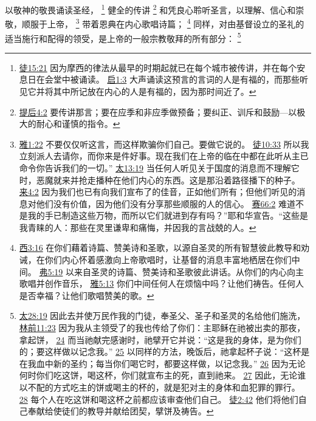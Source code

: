 \documentclass[12pt, a4paper, oneside]{ctexart}
\newcounter{parnum}[section]
\newcommand{\N}{%
   \noindent\refstepcounter{parnum}%
    \makebox[\parindent][l]{\textbf{\arabic{parnum}.}}}
\begin{document}
\N 以敬神的敬畏诵读圣经，
	\footnote {
		\href{https://biblehub.com/acts/15-21.htm}{徒15:21} 因为摩西的律法从最早的时期起就已在每个城市被传讲，并在每个安息日在会堂中被诵读。
		\href{https://biblehub.com/revelation/1-3.htm}{启1:3} 大声诵读这预言的言词的人是有福的，而那些听见它并将其中所记放在内心的人是有福的，因为那时间近了。
	}
	健全的传讲
	\footnote {
		\href{https://biblehub.com/2_timothy/4-2.htm}{提后4:2} 要传讲那言；要在应季和非应季做预备；要纠正、训斥和鼓励---以极大的耐心和谨慎的指令。
	}
	和凭良心聆听圣言，以理解、信心和崇敬，顺服于上帝，
	\footnote {
		\href{https://biblehub.com/james/1-22.htm}{雅1:22} 不要仅仅听这言，而这样欺骗你们自己。要做它说的。
		\href{https://biblehub.com/acts/10-33.htm}{徒10:33} 所以我立刻派人去请你，而你来是件好事。现在我们在上帝的临在中都在此听从主已命令你告诉我们的一切。”
		\href{https://biblehub.com/matthew/13-19.htm}{太13:19} 当任何人听见关于国度的消息而不理解它时，恶魔就来并抢走播种在他们内心的东西。这是那沿着路径播下的种子。
		\href{https://biblehub.com/hebrews/4-2.htm}{来4:2} 因为我们也已有向我们宣布了的佳音，正如他们所有；但他们听见的消息对他们没有价值，因为他们没有分享那些顺服的人的信心。
		\href{https://biblehub.com/isaiah/66-2.htm}{赛66:2} 难道不是我的手已制造这些万物，而所以它们就进到存有吗？”耶和华宣告。“这些是我青睐的人：那些在灵里谦卑和痛悔，并因我的言战兢的人。
	}
	带着恩典在内心歌唱诗篇；
	\footnote {
		\href{https://biblehub.com/colossians/3-16.htm}{西3:16} 在你们藉着诗篇、赞美诗和圣歌，以源自圣灵的所有智慧彼此教导和劝诫，在你们内心怀着感激向上帝歌唱时，让基督的消息丰富地栖居在你们中间。
		\href{https://biblehub.com/ephesians/5-19.htm}{弗5:19} 以来自圣灵的诗篇、赞美诗和圣歌彼此讲话。从你们的内心向主歌唱并创作音乐，
		\href{https://biblehub.com/james/5-13.htm}{雅5:13} 你们中间任何人在烦恼中吗？让他们祷告。任何人是否幸福？让他们歌唱赞美的歌。
	}
	同样，对由基督设立的圣礼的适当施行和配得的领受，是上帝的一般宗教敬拜的所有部分：
	\footnote {
		\href{https://biblehub.com/matthew/28-19.htm}{太28:19} 因此去并使万民作我的门徒，奉圣父、圣子和圣灵的名给他们施洗，
		\href{https://biblehub.com/1_corinthians/11-23.htm}{林前11:23} 因为我从主领受了的我也传给了你们：主耶稣在祂被出卖的那夜，拿起饼，
		\href{https://biblehub.com/1_corinthians/11-24.htm}{24} 而当祂献完感谢时，祂擘开它并说：“这是我的身体，是为你们的；要这样做以记念我。”
		\href{https://biblehub.com/1_corinthians/11-25.htm}{25} 以同样的方法，晚饭后，祂拿起杯子说：“这杯是在我血中新的圣约；每当你们喝它时，都要这样做，以记念我。”
		\href{https://biblehub.com/1_corinthians/11-26.htm}{26} 因为无论何时你们吃这饼，喝这杯，你们就宣布主的死，直到祂来。
		\href{https://biblehub.com/1_corinthians/11-27.htm}{27} 因此，无论谁以不配的方式吃主的饼或喝主的杯的，就是犯对主的身体和血犯罪的罪行。
		\href{https://biblehub.com/1_corinthians/11-28.htm}{28} 每个人在吃这饼和喝这杯之前都应该审查他们自己。
		\href{https://biblehub.com/acts/2-42.htm}{徒2:42} 他们将他们自己奉献给使徒们的教导并献给团契，擘饼及祷告。
	}
\end{document}
